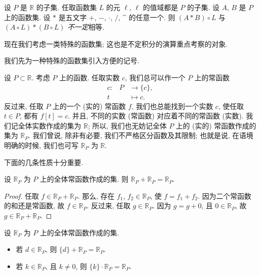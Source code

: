 \begin{example}
    设 $P$ 是 $\mathbb{R}$ 的子集. 任取函数集 $L$ 的元 $\ell$, $\ell$ 的值域都是 $P$ 的子集. 设 $A$, $B$ 是 $P$ 上的函数集. 设 $\ast$ 是五文字 $+$, $-$, $\cdot$, $/$, $\text{\textasciicircum}$ 的任意一个. 则 $(A \ast B) \circ L$ 与 $(A \circ L) \ast (B \circ L)$ \emph{不一定}相等.
\end{example}

现在我们考虑一类特殊的函数集; 这也是不定积分的演算重点考察的对象.

我们先为一种特殊的函数集引入方便的记号.

设 $P \subset \mathbb{R}$. 考虑 $P$ 上的函数. 任取实数 $c$, 我们总可以作一个 $P$ 上的常函数
\begin{align*}
    \text{$c$:} \quad
    P & \to \{ c \}, \\
    t & \mapsto c.
\end{align*}
反过来, 任取 $P$ 上的一个 (实的) 常函数 $f$, 我们也总能找到一个实数 $c$, 使任取 $t \in P$, 都有 $f[t] = c$. 并且, 不同的实数 (常函数) 对应着不同的常函数 (实数). 我们记全体实数作成的集为 $\mathbb{R}$; 所以, 我们也无妨记全体 $P$ 上的 (实的) 常函数作成的集为 $\mathbb{R}_{P}$. 我们曾说, 除非有必要, 我们不严格区分函数及其限制; 也就是说, 在语境明确的时候, 我们也可写 $\mathbb{R}_{P}$ 为 $\mathbb{R}$.

下面的几条性质十分重要.

\begin{theorem}
    设 $\mathbb{R}_{P}$ 为 $P$ 上的全体常函数作成的集. 则 $\mathbb{R}_{P} + \mathbb{R}_{P} = \mathbb{R}_{P}$.
\end{theorem}

\begin{proof}
    任取 $f \in \mathbb{R}_{P} + \mathbb{R}_{P}$. 那么, 存在 $f_1$, $f_2 \in \mathbb{R}_{P}$, 使 $f = f_1 + f_2$. 因为二个常函数的和还是常函数, 故 $f \in \mathbb{R}_{P}$. 反过来, 任取 $g \in \mathbb{R}_{P}$. 因为 $g = g + 0$, 且 $0 \in \mathbb{R}_{P}$, 故 $g \in \mathbb{R}_{P} + \mathbb{R}_{P}$.
\end{proof}

\begin{theorem}
    设 $\mathbb{R}_{P}$ 为 $P$ 上的全体常函数作成的集.
    \begin{itemize}
        \item 若 $d \in \mathbb{R}_{P}$, 则 $\{ d \} + \mathbb{R}_{P} = \mathbb{R}_{P}$.
        \item 若 $k \in \mathbb{R}_{P}$, 且 $k \neq 0$, 则 $\{ k \} \cdot \mathbb{R}_{P} = \mathbb{R}_{P}$.
    \end{itemize}
\end{theorem}

